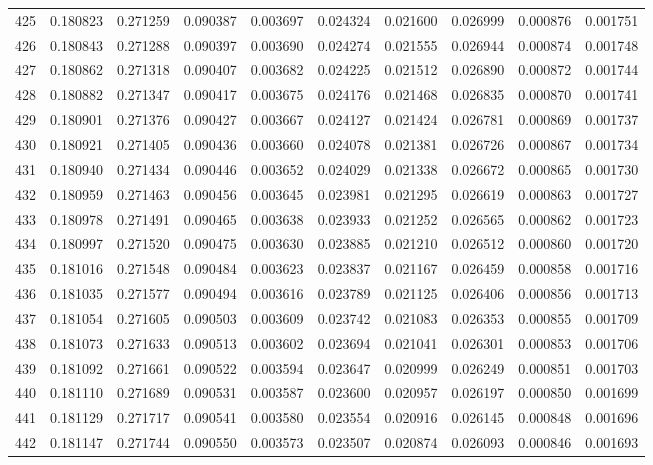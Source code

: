 \begin{tabular}{lrrrrrrrrr}
425 & 0.180823 & 0.271259 & 0.090387 & 0.003697 & 0.024324 & 0.021600 & 0.026999 & 0.000876 & 0.001751 \\
426 & 0.180843 & 0.271288 & 0.090397 & 0.003690 & 0.024274 & 0.021555 & 0.026944 & 0.000874 & 0.001748 \\
427 & 0.180862 & 0.271318 & 0.090407 & 0.003682 & 0.024225 & 0.021512 & 0.026890 & 0.000872 & 0.001744 \\
428 & 0.180882 & 0.271347 & 0.090417 & 0.003675 & 0.024176 & 0.021468 & 0.026835 & 0.000870 & 0.001741 \\
429 & 0.180901 & 0.271376 & 0.090427 & 0.003667 & 0.024127 & 0.021424 & 0.026781 & 0.000869 & 0.001737 \\
430 & 0.180921 & 0.271405 & 0.090436 & 0.003660 & 0.024078 & 0.021381 & 0.026726 & 0.000867 & 0.001734 \\
431 & 0.180940 & 0.271434 & 0.090446 & 0.003652 & 0.024029 & 0.021338 & 0.026672 & 0.000865 & 0.001730 \\
432 & 0.180959 & 0.271463 & 0.090456 & 0.003645 & 0.023981 & 0.021295 & 0.026619 & 0.000863 & 0.001727 \\
433 & 0.180978 & 0.271491 & 0.090465 & 0.003638 & 0.023933 & 0.021252 & 0.026565 & 0.000862 & 0.001723 \\
434 & 0.180997 & 0.271520 & 0.090475 & 0.003630 & 0.023885 & 0.021210 & 0.026512 & 0.000860 & 0.001720 \\
435 & 0.181016 & 0.271548 & 0.090484 & 0.003623 & 0.023837 & 0.021167 & 0.026459 & 0.000858 & 0.001716 \\
436 & 0.181035 & 0.271577 & 0.090494 & 0.003616 & 0.023789 & 0.021125 & 0.026406 & 0.000856 & 0.001713 \\
437 & 0.181054 & 0.271605 & 0.090503 & 0.003609 & 0.023742 & 0.021083 & 0.026353 & 0.000855 & 0.001709 \\
438 & 0.181073 & 0.271633 & 0.090513 & 0.003602 & 0.023694 & 0.021041 & 0.026301 & 0.000853 & 0.001706 \\
439 & 0.181092 & 0.271661 & 0.090522 & 0.003594 & 0.023647 & 0.020999 & 0.026249 & 0.000851 & 0.001703 \\
440 & 0.181110 & 0.271689 & 0.090531 & 0.003587 & 0.023600 & 0.020957 & 0.026197 & 0.000850 & 0.001699 \\
441 & 0.181129 & 0.271717 & 0.090541 & 0.003580 & 0.023554 & 0.020916 & 0.026145 & 0.000848 & 0.001696 \\
442 & 0.181147 & 0.271744 & 0.090550 & 0.003573 & 0.023507 & 0.020874 & 0.026093 & 0.000846 & 0.001693 \\

\end{tabular}
